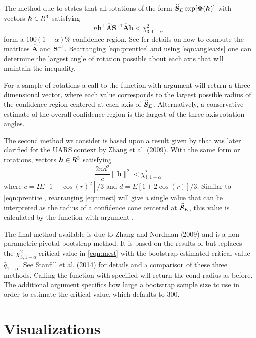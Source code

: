 The method due to \cite{prentice1986} states that all rotations of the form $\widehat{\bm S}_E\exp[\bm{\Phi}(\bm h)]$ with vectors $\bm h\in R^3$ satisfying
\begin{equation}\label{eqn:prentice}
n\bm h^\top\widehat{\bm A}\bm{S}^{-1}\widehat{\bm A}\bm h<\chi^2_{3,1-\alpha}
\end{equation}
form a $100(1-\alpha)\%$ confidence region.  See \cite{rancourt2000} for details on how to compute the matrices $\widehat{\bm A}$ and $\bm{S}^{-1}$.  Rearranging \eqref{eqn:prentice} and using \eqref{eqn:angleaxis} one can determine the largest angle of rotation possible about each axis that will maintain the inequality.

For a sample of rotations a call to the  function with argument  will return a three-dimensional vector, where each value corresponds to the largest possible radius of the confidence region centered at each axis of $\widehat{\bm S}_E$.  Alternatively, a conservative estimate of the overall confidence region is the largest of the three axis rotation angles.

The second method we consider is based upon a result given by \cite{chang2001} that was later clarified for the UARS context by Zhang et al. (2009).  With the same form or rotations, vectors $\bm h\in R^3$ satisfying
\begin{equation}\label{eqn:mest}
\frac{2nd^2}{c}\|\bm h\|^2<\chi^2_{3,1-\alpha}
\end{equation}
where $c=2E[1-\cos(r)^2]/3$ and $d=E[1+2\cos(r)]/3$.  Similar to \eqref{eqn:prentice}, rearranging \eqref{eqn:mest} will give a single value that can be interpreted as the radius of a confidence cone centered at $\widehat{\bm S}_E$, this value is calculated by the  function with argument .

The final method available is due to Zhang and Nordman (2009) and is a non-parametric pivotal bootstrap method.  It is based on the results of \cite{chang2001} but replaces the $\chi^2_{3,1-\alpha}$ critical value in \eqref{eqn:mest} with the bootstrap estimated critical value $\hat{q}_{1-\alpha}$.  See Stanfill et al. (2014) for details and a comparison of these three methods.  Calling the  function with  specified will return the cond radius as before.  The additional  argument specifics how large a bootstrap sample size to use in order to estimate the critical value, which defaults to 300. 


\section{Visualizations}

